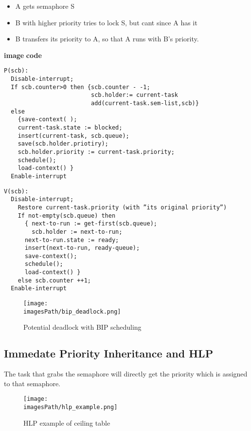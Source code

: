 \begin{itemize}
  \item A gets semaphore S
  \item B with higher priority tries to lock S, but cant since A has it
  \item B transfers its priority to A, so that A runs with B's priority.
\end{itemize}

\textbf{image}
\textbf{code}
\begin{verbatim}
P(scb):
  Disable-interrupt;
  If scb.counter>0 then {scb.counter - -1;
                         scb.holder:= current-task
                         add(current-task.sem-list,scb)}
  else
    {save-context( );
    current-task.state := blocked;
    insert(current-task, scb.queue);
    save(scb.holder.priotiry);
    scb.holder.priority := current-task.priority;
    schedule();
    load-context() }
  Enable-interrupt
\end{verbatim}

\begin{verbatim}
V(scb):
  Disable-interrupt;
    Restore current-task.priority (with ”its original priority”)
    If not-empty(scb.queue) then
      { next-to-run := get-first(scb.queue);
        scb.holder := next-to-run;
      next-to-run.state := ready;
      insert(next-to-run, ready-queue);
      save-context();
      schedule();
      load-context() }
    else scb.counter ++1;
  Enable-interrupt
\end{verbatim}

\begin{figure}[H]
    \centering
    \texttt{[image: \\imagesPath/bip\_deadlock.png]}
    \caption{Potential deadlock with BIP scheduling}
\end{figure}


\subsection{Immedate Priority Inheritance and HLP}
The task that grabs the semaphore will directly get the priority which is assigned 
to that semaphore.

\begin{figure}[H]
    \centering
    \texttt{[image: \\imagesPath/hlp\_example.png]}
    \caption{HLP example of ceiling table}
\end{figure}



